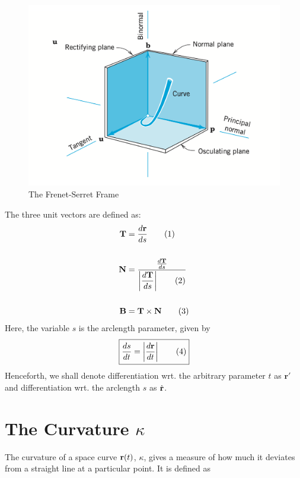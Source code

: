 \documentclass{article}
\begin{document}
\begin{flushleft}
	\begin{figure}[h!]
     \includegraphics[width=\linewidth]{tnb.png}
     \caption{The Frenet-Serret Frame}
     \label{fig:boat1}
     \end{figure}
     The three unit vectors are defined as:\\
     \begin{align*}
     \mathbf{T} &= \frac{d\mathbf{r}}{ds}\tag{1}\\ 
     \\
     \mathbf{N} &= \frac{\frac{d\mathbf{T}}{ds}}{\displaystyle\left\lvert \frac{d\mathbf{T}}{ds} \right\rvert\tag{2}}\\
     \\
     \mathbf{B} &= \mathbf{T}\times \mathbf{N}\tag{3}
     \end{align*}
     Here,  the variable $s$ is the arclength parameter,  given by 
     \begin{equation*}
     \boxed{\frac{ds}{dt} =\displaystyle\left\lvert \frac{d\mathbf{r}}{dt} \right\rvert \tag{4}}
     \end{equation*}
     Henceforth,  we shall denote differentiation wrt.  the arbitrary parameter $t$ as $\mathbf{r'}$ and differentiation wrt. the 
     arclength $s$ as $\dot{\mathbf{r}}$.
    
    \color{blue}
     \section{The Curvature $\kappa$}
     \color{black}
   
     
     The curvature of a space curve $\mathbf{r}(t)$,  $\kappa$, gives a measure of how much it deviates from a straight line   at a particular point.  It is defined as
     

\end{flushleft}
\end{document}
